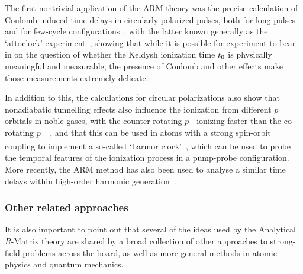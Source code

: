 The first nontrivial application of the ARM theory was the precise calculation of Coulomb-induced time delays in circularly polarized pulses, both for long pulses~\cite{ ARM_circular, ARM_trajectories} and for few-cycle configurations~\cite{ARM_attoclock}, with the latter known generally as the `attoclock' experiment~\cite{ pfeiffer_attoclock_2012}, showing that while it is possible for experiment to bear in on the question of whether the Keldysh ionization time ${t_0}$ is physically meaningful and measurable, the presence of Coulomb and other effects make those measurements extremely delicate. 

In addition to this, the calculations for circular polarizations also show that nonadiabatic tunnelling effects also influence the ionization from different $p$ orbitals in noble gases, with the counter-rotating $p_-$ ionizing faster than the co-rotating $p_+$~\cite{ARM_circular}, and that this can be used in atoms with a strong spin-orbit coupling to implement a so-called `Larmor clock'~\cite{ARM_spin-orbit, ARM_ring-currents}, which can be used to probe the temporal features of the ionization process in a pump-probe configuration. More recently, the ARM method has also been used to analyse a similar time delays within high-order harmonic generation~\cite{ ARM_Coulomb_HHG}.














\subsubsection{Other related approaches}
It is also important to point out that several of the ideas used by the Analytical $R$-Matrix theory are shared by a broad collection of other approaches to strong-field problems across the board, as well as more general methods in atomic physics and quantum mechanics.

